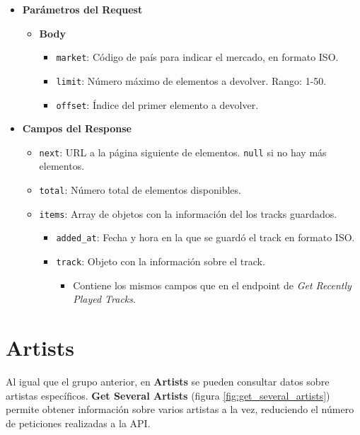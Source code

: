 \begin{itemize}
    \item \textbf{Parámetros del Request}
          \begin{itemize}
              \item \textbf{Body}
                    \begin{itemize}
                        \item \texttt{market}: Código de país para indicar el mercado, en formato ISO.
                        \item \texttt{limit}: Número máximo de elementos a devolver. Rango: 1-50.
                        \item \texttt{offset}: Índice del primer elemento a devolver.
                    \end{itemize}
          \end{itemize}
    \item \textbf{Campos del Response}
          \begin{itemize}
              \item \texttt{next}: URL a la página siguiente de elementos. \texttt{null} si no hay más elementos.
              \item \texttt{total}: Número total de elementos disponibles.
              \item \texttt{items}: Array de objetos con la información del los tracks guardados.
                    \begin{itemize}
                        \item \texttt{added\_at}: Fecha y hora en la que se guardó el track en formato ISO.
                        \item \texttt{track}: Objeto con la información sobre el track.
                              \begin{itemize}
                                  \item Contiene los mismos campos que en el endpoint de \textit{Get Recently Played Tracks}.
                              \end{itemize}
                    \end{itemize}
          \end{itemize}
\end{itemize}

\section*{Artists}

Al igual que el grupo anterior, en \textbf{Artists} se pueden consultar datos sobre artistas específicos. \textbf{Get Several Artists} (figura \ref{fig:get_several_artists}) permite obtener información sobre varios artistas a la vez, reduciendo el número de peticiones realizadas a la API.

